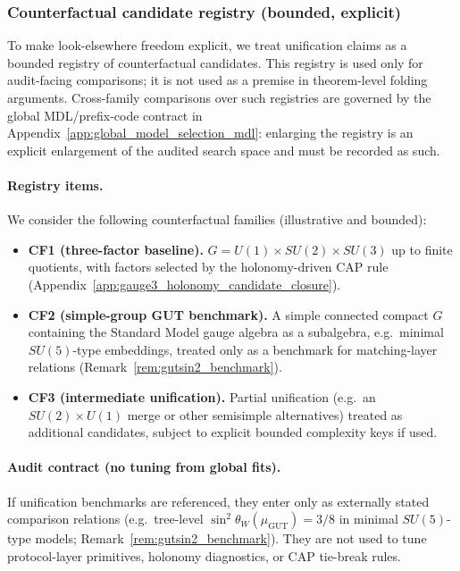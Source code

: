 \subsubsection{Counterfactual candidate registry (bounded, explicit)}
\AuditTag To make look-elsewhere freedom explicit, we treat unification claims as a bounded registry of counterfactual candidates.
This registry is used only for audit-facing comparisons; it is not used as a premise in theorem-level folding arguments.
\AuditTag Cross-family comparisons over such registries are governed by the global MDL/prefix-code contract in Appendix~\ref{app:global_model_selection_mdl}:
enlarging the registry is an explicit enlargement of the audited search space and must be recorded as such.

\paragraph{Registry items.}
We consider the following counterfactual families (illustrative and bounded):
\begin{itemize}
\item \textbf{CF1 (three-factor baseline).} $G=U(1)\times SU(2)\times SU(3)$ up to finite quotients, with factors selected by the holonomy-driven CAP rule (Appendix~\ref{app:gauge3_holonomy_candidate_closure}).
\item \textbf{CF2 (simple-group GUT benchmark).} A simple connected compact $G$ containing the Standard Model gauge algebra as a subalgebra, e.g.\ minimal $SU(5)$-type embeddings, treated only as a benchmark for matching-layer relations (Remark~\ref{rem:gutsin2_benchmark}).
\item \textbf{CF3 (intermediate unification).} Partial unification (e.g.\ an $SU(2)\times U(1)$ merge or other semisimple alternatives) treated as additional candidates, subject to explicit bounded complexity keys if used.
\end{itemize}

\paragraph{Audit contract (no tuning from global fits).}
\AuditTag If unification benchmarks are referenced, they enter only as externally stated comparison relations (e.g.\ tree-level $\sin^2\theta_W(\mu_{\mathrm{GUT}})=3/8$ in minimal $SU(5)$-type models; Remark~\ref{rem:gutsin2_benchmark}).
They are not used to tune protocol-layer primitives, holonomy diagnostics, or CAP tie-break rules.

